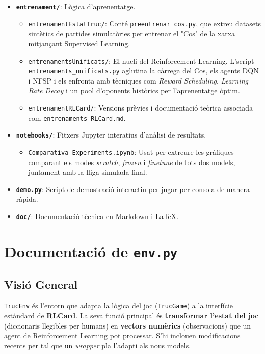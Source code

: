 \documentclass[a4paper,11pt]{report}
\begin{document}
\begin{itemize}
    \item \textbf{\texttt{entrenament/}}: Lògica d'aprenentatge.
    \begin{itemize}
        \item \texttt{entrenamentEstatTruc/}: Conté \texttt{preentrenar\_cos.py}, que extreu datasets sintètics de partides simulatòries per entrenar el "Cos" de la xarxa mitjançant Supervised Learning.
        \item \texttt{entrenamentsUnificats/}: El nucli del Reinforcement Learning. L'script \texttt{entrenaments\_unificats.py} aglutina la càrrega del Cos, els agents DQN i NFSP i els enfronta amb tècniques com \textit{Reward Scheduling}, \textit{Learning Rate Decay} i un pool d'oponents històrics per l'aprenentatge òptim.
        \item \texttt{entrenamentRLCard/}: Versions prèvies i documentació teòrica associada com \texttt{entrenaments\_RLCard.md}.
    \end{itemize}

    \item \textbf{\texttt{notebooks/}}: Fitxers Jupyter interatius d'anàlisi de resultats.
    \begin{itemize}
        \item \texttt{Comparativa\_Experiments.ipynb}: Usat per extreure les gràfiques comparant els modes \textit{scratch}, \textit{frozen} i \textit{finetune} de tots dos models, juntament amb la lliga simulada final.
    \end{itemize}

    \item \textbf{\texttt{demo.py}}: Script de demostració interactiu per jugar per consola de manera ràpida.
    \item \textbf{\texttt{doc/}}: Documentació tècnica en Markdown i \LaTeX.
\end{itemize}

\chapter{Documentació de \texttt{env.py}}

\section{Visió General}

\texttt{TrucEnv} és l'entorn que adapta la lògica del joc (\texttt{TrucGame}) a la interfície estàndard de \textbf{RLCard}. La seva funció principal és \textbf{transformar l'estat del joc} (diccionaris llegibles per humans) en \textbf{vectors numèrics} (observacions) que un agent de Reinforcement Learning pot processar. S'hi inclouen modificacions recents per tal que un \textit{wrapper} pla l'adapti als nous models.
\end{document}

